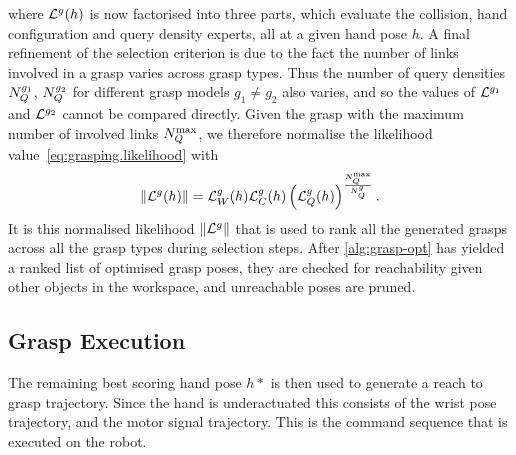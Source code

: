 where ${\cal L}^g(h)$ is now factorised into three parts, which evaluate the collision, hand configuration and query density experts, all at a given hand pose $h$. A final refinement  of the selection criterion is due to the fact the number of links involved in a grasp varies across grasp types. Thus the number of query densities $N^{g_1}_Q$, $N^{g_2}_Q$ for different grasp models $g_1 \neq g_2$ also varies, and so the values of ${\cal L}^{g_1}$ and ${\cal L}^{g_2}$ cannot be compared directly. Given the grasp with the maximum number of involved links $N^{\max}_Q$, we therefore normalise the likelihood value~\eqref{eq:grasping.likelihood} with
\begin{equation}
\left\|{\cal L}^g(h)\right\| = {\cal L}^g_\coll(h) {\cal L}^g_\hc(h) \left({\cal L}^g_\qd(h)\right)^{\frac{N^{\max}_\qd}{N^g_\qd}}.
\label{eq:grasping.likelihood.norm}
\end{equation}
It is this normalised likelihood $\left\|{\cal L}^g\right\|$ that is used to rank all the generated grasps across all the grasp types during selection steps. After \alg\ref{alg:grasp-opt} has yielded a ranked list of optimised grasp poses, they are checked for reachability given other objects in the workspace, and unreachable poses are pruned. 

\subsection{Grasp Execution}
The remaining best scoring hand pose $h*$ is then used to generate a reach to grasp trajectory. Since the hand is underactuated this consists of the wrist pose trajectory, and the motor signal trajectory. This is the command sequence that is executed on the robot.